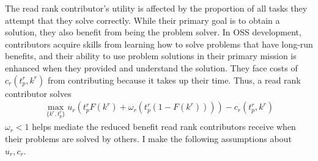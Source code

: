 \documentclass[source/paper/main.tex]{subfiles}
\begin{document}
\qquad The read rank contributor's utility is affected by the proportion of all tasks they attempt that they solve correctly. While their primary goal is to obtain a solution, they also benefit from being the problem solver. In OSS development, contributors acquire skills from learning how to solve problems that have long-run benefits, and their ability to use problem solutions in their primary mission is enhanced when they provided and understand the solution. They face costs of $c_r(t_p^r, k^r)$  from contributing because it takes up their time. Thus, a read rank contributor solves 
\begin{align}
    \max_{\{k^r, t_p^r\}} u_r\left(t_p^rF(k^r) + \omega_r(t_p^r (1-F(k^r))) \right) - c_r(t_p^r, k^r) \label{read_rank_problem}
\end{align}
$\omega_r < 1$ helps mediate the reduced benefit read rank contributors receive when their problems are solved by others. 
I make the following assumptions about $u_r, c_r$. 
\end{document}

